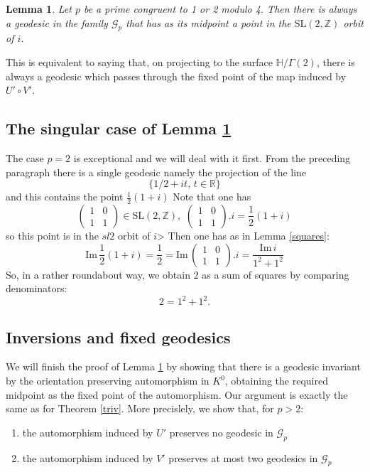 \documentclass[12pt,a4paper]{amsart}
\newtheorem{lem}[thm]{Lemma}
\def\HH{\mathbb{H}}
\def\im{\mathrm{Im}\,}
\def\xx{\HH/g2}
\def\ZZ{\mathbb{Z}}
\def\RR{\mathbb{R}}
\def\sl2{\mathrm{SL}(2, \ZZ)}
\def\g2{\Gamma(2)}
\def\xx{\HH/\g2}
\def\ggp{\mathcal{G}_p}
\begin{document}
\begin{lem} \label{midpoint}
Let $p$ be a prime congruent to 1 or 2 modulo 4.
Then there is always a geodesic 
in the family $\ggp$
 that has as its  midpoint a point in the $\sl2$  orbit of $i$.
\end{lem}


This is equivalent to saying that, 
on projecting to the surface  $\xx$,
 there  is always a geodesic which passes through
the  fixed point of the map induced by $U'\circ V'$.

\subsection{The singular case of Lemma \ref{midpoint}}

The case $p=2$ is exceptional and we will deal with it first.
From the preceding paragraph there is a single geodesic namely 
the projection of the line 
$$\{ 1/2 + i t,\, t \in \RR \}$$
and this contains the point  $\frac{1}{2 }(1+ i)$
Note that one has 
$$\begin{pmatrix}
1 & 0 \\
1 & 1
\end{pmatrix} \in \sl2,\,\, \begin{pmatrix}
1 & 0 \\
1 & 1
\end{pmatrix}.i  = \frac{1}{2 }(1+ i)$$
so this point is in the $sl2$ orbit of $i$>
Then one has as in Lemma \ref{squares}:
$$\im \frac{1}{2 }(1+ i) = \frac{1}{2}  =  \im \begin{pmatrix}
1 & 0 \\
1 & 1
\end{pmatrix}.i = \frac{\im i}{ 1^2 + 1^2}$$
So, in a rather roundabout way, we obtain $2$ as a sum of squares by comparing denominators:
$$2 = 1^2 + 1^2.$$




\subsection{Inversions and fixed geodesics}

We will finish the proof of  Lemma \ref{midpoint}
by showing that there is a geodesic invariant by 
the orientation preserving automorphism in $K^0$,
obtaining the required midpoint as the fixed point of the automorphism.
Our  argument is exactly  the same as for
 Theorem \ref{triv}.
 More precislely, we show that, for $p > 2$:
\begin{enumerate}
\item the automorphism induced by $U'$ preserves no geodesic in  $\ggp$
\item the automorphism induced by $V'$ preserves at most two geodesics in $\ggp$
\end{enumerate}
\end{document}
